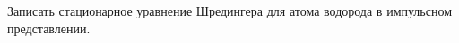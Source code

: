 \begin{leftrules}
	Записать стационарное уравнение Шредингера для атома водорода в импульсном представлении.
\end{leftrules}

